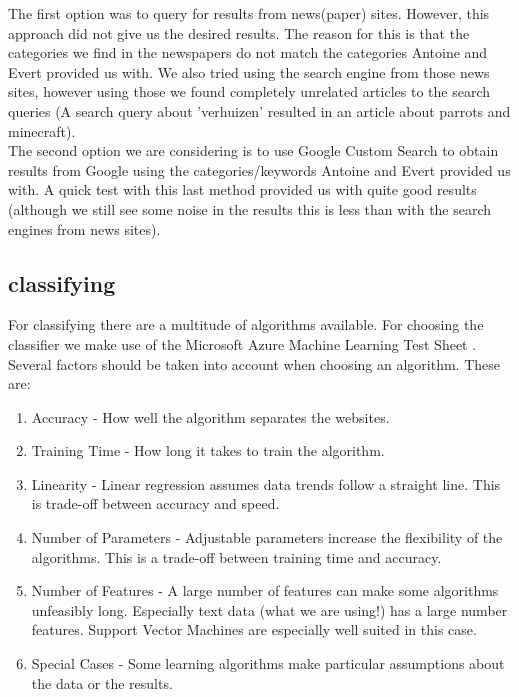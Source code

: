 The first option was to query for results from news(paper) sites. However, this approach did not give us the desired results. The reason for this is that the categories we find in the newspapers do not match the categories Antoine and Evert provided us with. We also tried using the search engine from those news sites, however using those we found completely unrelated articles to the search queries (A search query about 'verhuizen' resulted in an article about parrots and minecraft).\\

The second option we are considering is to use Google Custom Search to obtain results from Google using the categories/keywords Antoine and Evert provided us with. A quick test with this last method provided us with quite good results (although we still see some noise in the results this is less than with the search engines from news sites).\\


\subsection{classifying}
For classifying there are a multitude of algorithms available. For choosing the classifier we make use of the Microsoft Azure Machine Learning Test Sheet \cite{MLCheatSheet}. Several factors should be taken into account when choosing an algorithm. These are:
    \begin{enumerate}
        \item Accuracy - How well the algorithm separates the websites.
        \item Training Time - How long it takes to train the algorithm.
        \item Linearity - Linear regression assumes data trends follow a straight line. This is trade-off between accuracy and speed.
        \item Number of Parameters - Adjustable parameters increase the flexibility of the algorithms. This is a trade-off between training time and accuracy.
        \item Number of Features - A large number of features can make some algorithms unfeasibly long. Especially text data (what we are using!) has a large number features. Support Vector Machines are especially well suited in this case.
        \item Special Cases - Some learning algorithms make particular assumptions about the data or the results.
    \end{enumerate}
    
